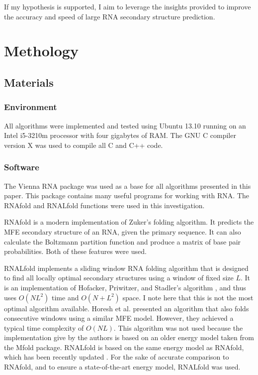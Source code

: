 \documentclass{cshonours}
\begin{document}
If my hypothesis is supported, I aim to leverage the insights provided to improve the accuracy and speed of large RNA secondary structure prediction.

\chapter{Methology}

\section{Materials}
\subsection{Environment}
All algorithms were implemented and tested using Ubuntu 13.10 running on an Intel i5-3210m processor with four gigabytes of RAM. The GNU C compiler version X was used to compile all C and C++ code. 

\subsection{Software}
The Vienna RNA package was used as a base for all algorithms presented in this paper. This package contains many useful programs for working with RNA. The RNAfold and RNALfold functions were used in this investigation. 

RNAfold is a modern implementation of Zuker’s folding algorithm. It predicts the MFE secondary structure of an RNA, given the primary sequence. It can also calculate the Boltzmann partition function and produce a matrix of base pair probabilities. Both of these features were used. 

RNALfold implements a sliding window RNA folding algorithm that is designed to find all locally optimal secondary structures using a window of fixed size $L$. It is an implementation of Hofacker, Priwitzer, and Stadler's algorithm \cite{hofacker2004prediction}, and thus uses $O(NL^2)$ time and $O(N + L^2)$ space. I note here that this is not the most optimal algorithm available. Horesh et al. \cite{horesh2009rnaslider} presented an algorithm that also folds consecutive windows using a similar MFE model. However, they achieved a typical time complexity of $O(NL)$. This algorithm was not used because the implementation give by the authors is based on an older energy model taken from the Mfold package. RNALfold is based on the same energy model as RNAfold, which has been recently updated \cite{lorenz2011viennarna}. For the sake of accurate comparison to RNAfold, and to ensure a state-of-the-art energy model, RNALfold was used.
\end{document}
